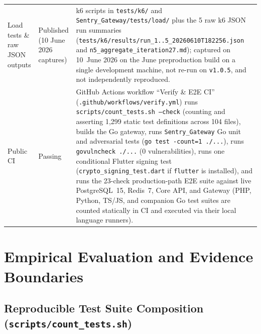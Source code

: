 \documentclass[11pt, a4paper]{article}
\begin{document}
\begin{small}
\begin{longtable}{@{} p{3.6cm} p{2.6cm} p{9.2cm} @{}}
\addlinespace
Load tests \& raw JSON outputs & Published (10 June 2026 captures) & k6 scripts in \texttt{tests/k6/} and \texttt{Sentry\_Gateway/tests/load/} plus the 5 raw k6 JSON run summaries (\texttt{tests/k6/results/run\_1..5\_20260610T182256.json} and \texttt{n5\_aggregate\_iteration27.md}); captured on 10~June 2026 on the June preproduction build on a single development machine, not re-run on \texttt{v1.0.5}, and not independently reproduced. \\
\addlinespace
Public CI & Passing & GitHub Actions workflow ``Verify \& E2E CI'' (\texttt{.github/workflows/verify.yml}) runs \texttt{scripts/count\_tests.sh --check} (counting and asserting 1,299 static test definitions across 104 files), builds the Go gateway, runs \texttt{Sentry\_Gateway} Go unit and adversarial tests (\texttt{go test -count=1 ./...}), runs \texttt{govulncheck ./...} (0 vulnerabilities), runs one conditional Flutter signing test (\texttt{crypto\_signing\_test.dart} if \texttt{flutter} is installed), and runs the 23-check production-path E2E suite against live PostgreSQL~15, Redis~7, Core API, and Gateway (PHP, Python, TS/JS, and companion Go test suites are counted statically in CI and executed via their local language runners). \\
\end{longtable}
\end{small}

\section{Empirical Evaluation and Evidence Boundaries}
\label{sec:evaluation}

\subsection{Reproducible Test Suite Composition (\texttt{scripts/count\_tests.sh})}
\label{subsec:test-suite}
\end{document}
